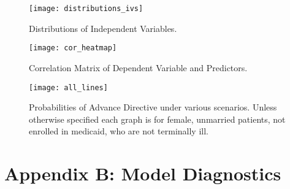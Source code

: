\documentclass{article}
\begin{document}
\begin{appendix}

\begin{figure}[h]
\centering
\texttt{[image: distributions\_ivs]}
\caption{Distributions of Independent Variables.}
\end{figure}

\begin{figure}[h]
\centering
\texttt{[image: cor\_heatmap]}
\caption{Correlation Matrix of Dependent Variable and Predictors.}
\end{figure}

\begin{figure}[h]
\centering
\texttt{[image: all\_lines]}
\caption{Probabilities of Advance Directive under various scenarios. Unless otherwise specified each graph is for female, unmarried patients, not enrolled in medicaid, who are not terminally ill.}
\end{figure}

\section{Appendix B: Model Diagnostics}


\end{appendix}
\end{document}
